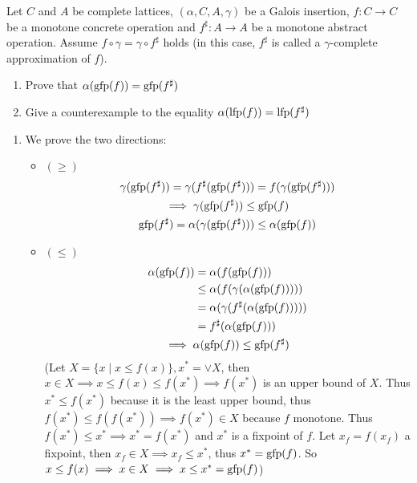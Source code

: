 \begin{exercise}{
    Let $C$ and $A$ be complete lattices, $(\alpha, C, A, \gamma)$ be a Galois insertion, $f: C \to C$ be a monotone concrete operation and $f^\sharp: A \to A$ be a monotone abstract operation. Assume $f \circ \gamma = \gamma \circ f^\sharp$ holds (in this case, $f^\sharp$ is called a $\gamma$-complete approximation of $f$).
    \begin{enumerate}[1.]
        \item Prove that $\alpha(\operatorname{gfp}(f)) = \operatorname{gfp}(f^\sharp)$
        \item Give a counterexample to the equality $\alpha(\operatorname{lfp}(f)) = \operatorname{lfp}(f^\sharp)$
    \end{enumerate}
}
    \begin{enumerate}[1.]
        \item We prove the two directions:
        \begin{itemize}
            \item $(\geq)$
            \begin{gather*}
                \gamma(\operatorname{gfp}(f^\sharp)) = \gamma(f^\sharp (\operatorname{gfp}(f^\sharp))) = f(\gamma(\operatorname{gfp}(f^\sharp))) \\
                \implies \gamma(\operatorname{gfp}(f^\sharp)) \leq \operatorname{gfp}(f) \\
                \operatorname{gfp}(f^\sharp) = \alpha(\gamma(\operatorname{gfp}(f^\sharp))) \leq \alpha(\operatorname{gfp}(f))
            \end{gather*}
            \item $(\leq)$
            \begin{gather*}
                \begin{aligned}
                    \alpha(\operatorname{gfp}(f)) &= \alpha(f(\operatorname{gfp}(f))) \\
                    &\leq \alpha(f(\gamma(\alpha(\operatorname{gfp}(f))))) \\
                    &= \alpha(\gamma(f^\sharp(\alpha(\operatorname{gfp}(f))))) \\
                    &= f^\sharp(\alpha(\operatorname{gfp}(f)))
                \end{aligned} \\
                \implies \alpha(\operatorname{gfp}(f)) \leq \operatorname{gfp}(f^\sharp)
            \end{gather*}
            (Let $X = \{x \mid x \leq f(x) \}, x^* = \vee X$, then $x \in X \implies x \leq f(x) \leq f(x^*) \implies f(x^*)$ is an upper bound of $X$. Thus $x^* \leq f(x^*)$ because it is the least upper bound, thus $f(x^*) \leq f(f(x^*)) \implies f(x^*) \in X$ because $f$ monotone. Thus $f(x^*) \leq x^* \implies x^* = f(x^*)$ and $x^*$ is a fixpoint of $f$. Let $x_f = f(x_f)$ a fixpoint, then $x_f \in X \implies x_f \leq x^*$, thus $x^* = \operatorname{gfp}(f)$. So $x \leq f(x) \implies x \in X \implies x \leq x^* = \operatorname{gfp}(f)$)

\end{itemize}
\end{enumerate}
\end{exercise}
